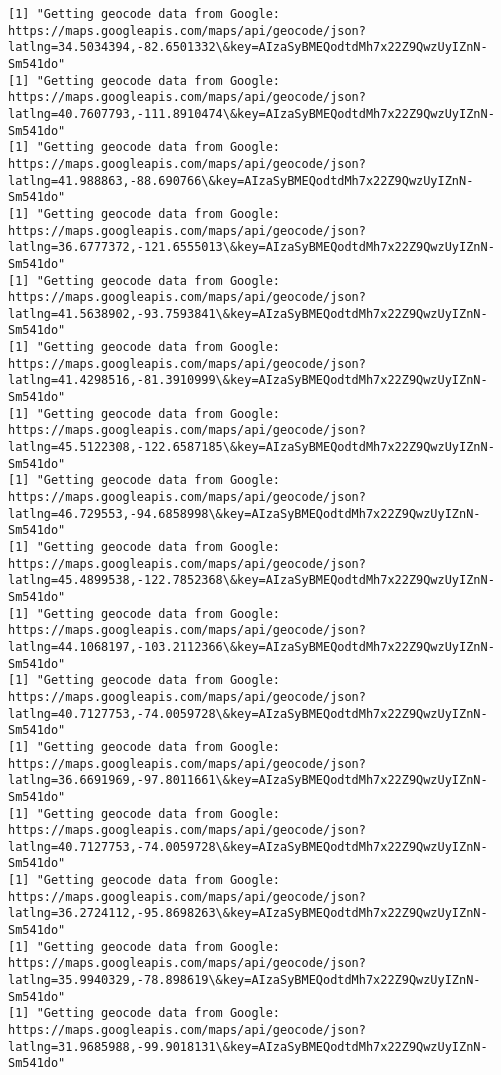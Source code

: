 \documentclass[11pt]{article}
\begin{document}
\begin{Verbatim}[commandchars=\\\{\}]
[1] "Getting geocode data from Google: https://maps.googleapis.com/maps/api/geocode/json?latlng=34.5034394,-82.6501332\&key=AIzaSyBMEQodtdMh7x22Z9QwzUyIZnN-Sm541do"
[1] "Getting geocode data from Google: https://maps.googleapis.com/maps/api/geocode/json?latlng=40.7607793,-111.8910474\&key=AIzaSyBMEQodtdMh7x22Z9QwzUyIZnN-Sm541do"
[1] "Getting geocode data from Google: https://maps.googleapis.com/maps/api/geocode/json?latlng=41.988863,-88.690766\&key=AIzaSyBMEQodtdMh7x22Z9QwzUyIZnN-Sm541do"
[1] "Getting geocode data from Google: https://maps.googleapis.com/maps/api/geocode/json?latlng=36.6777372,-121.6555013\&key=AIzaSyBMEQodtdMh7x22Z9QwzUyIZnN-Sm541do"
[1] "Getting geocode data from Google: https://maps.googleapis.com/maps/api/geocode/json?latlng=41.5638902,-93.7593841\&key=AIzaSyBMEQodtdMh7x22Z9QwzUyIZnN-Sm541do"
[1] "Getting geocode data from Google: https://maps.googleapis.com/maps/api/geocode/json?latlng=41.4298516,-81.3910999\&key=AIzaSyBMEQodtdMh7x22Z9QwzUyIZnN-Sm541do"
[1] "Getting geocode data from Google: https://maps.googleapis.com/maps/api/geocode/json?latlng=45.5122308,-122.6587185\&key=AIzaSyBMEQodtdMh7x22Z9QwzUyIZnN-Sm541do"
[1] "Getting geocode data from Google: https://maps.googleapis.com/maps/api/geocode/json?latlng=46.729553,-94.6858998\&key=AIzaSyBMEQodtdMh7x22Z9QwzUyIZnN-Sm541do"
[1] "Getting geocode data from Google: https://maps.googleapis.com/maps/api/geocode/json?latlng=45.4899538,-122.7852368\&key=AIzaSyBMEQodtdMh7x22Z9QwzUyIZnN-Sm541do"
[1] "Getting geocode data from Google: https://maps.googleapis.com/maps/api/geocode/json?latlng=44.1068197,-103.2112366\&key=AIzaSyBMEQodtdMh7x22Z9QwzUyIZnN-Sm541do"
[1] "Getting geocode data from Google: https://maps.googleapis.com/maps/api/geocode/json?latlng=40.7127753,-74.0059728\&key=AIzaSyBMEQodtdMh7x22Z9QwzUyIZnN-Sm541do"
[1] "Getting geocode data from Google: https://maps.googleapis.com/maps/api/geocode/json?latlng=36.6691969,-97.8011661\&key=AIzaSyBMEQodtdMh7x22Z9QwzUyIZnN-Sm541do"
[1] "Getting geocode data from Google: https://maps.googleapis.com/maps/api/geocode/json?latlng=40.7127753,-74.0059728\&key=AIzaSyBMEQodtdMh7x22Z9QwzUyIZnN-Sm541do"
[1] "Getting geocode data from Google: https://maps.googleapis.com/maps/api/geocode/json?latlng=36.2724112,-95.8698263\&key=AIzaSyBMEQodtdMh7x22Z9QwzUyIZnN-Sm541do"
[1] "Getting geocode data from Google: https://maps.googleapis.com/maps/api/geocode/json?latlng=35.9940329,-78.898619\&key=AIzaSyBMEQodtdMh7x22Z9QwzUyIZnN-Sm541do"
[1] "Getting geocode data from Google: https://maps.googleapis.com/maps/api/geocode/json?latlng=31.9685988,-99.9018131\&key=AIzaSyBMEQodtdMh7x22Z9QwzUyIZnN-Sm541do"

\end{Verbatim}
\end{document}
